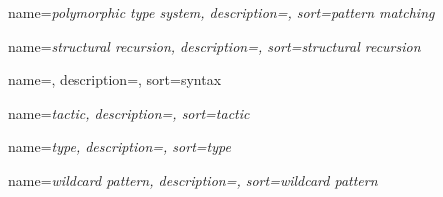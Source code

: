 {
  name=\sl{polymorphic type system},
  description={},
  sort={pattern matching}
}

{
  name=\sl{structural recursion},
  description={},
  sort={structural recursion}
}

{
  name=,
  description={},
  sort={syntax}
}

{
  name=\sl{tactic},
  description={},
  sort={tactic}
}

{
  name=\sl{type},
  description={},
  sort={type}
}

{
  name=\sl{wildcard pattern},
  description={},
  sort={wildcard pattern}
}

